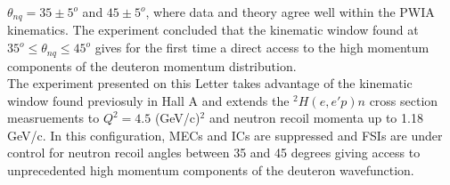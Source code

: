 $\theta_{nq}=35\pm5^{o}$ and $45\pm5^{o}$, where data and theory agree well within the PWIA kinematics. The experiment concluded that the kinematic window found
at $35^{o}\leq \theta_{nq}\leq45^{o}$ gives for the first time a direct access to the high momentum components of the deuteron momentum distribution. \\
\indent The experiment presented on this Letter takes advantage of the kinematic window found previosuly in Hall A and extends the $^{2}H(e,e'p)n$ cross section measruements to $Q^{2}=4.5$ (GeV/c)$^{2}$
and neutron recoil momenta up to 1.18 GeV/c. In this configuration, MECs and ICs are suppressed and FSIs are under control for neutron recoil angles between 35 and 45 degrees
giving access to unprecedented high momentum components of the deuteron wavefunction. \\
